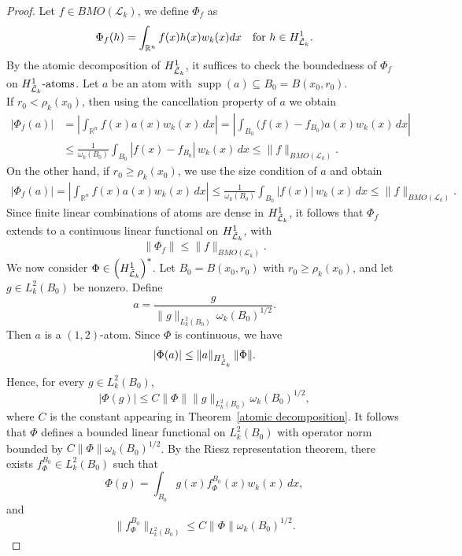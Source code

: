 \documentclass[10pt,a4paper]{amsart}
\begin{document}
\begin{proof}
Let $f \in BMO(\mathcal{L}_k)$, we define $\Phi_f$ as 
\begin{align*}
    \Phi_f(h) = \int_{\mathbb{R}^n} f(x)h(x)w_k(x)dx \quad \text{for } h\in H_{\Tilde{\mathcal{L}}_k}^1.
\end{align*}
By the atomic decomposition of $H_{\Tilde{\mathcal{L}}_k}^1$, it suffices to check the boundedness of  $\Phi_f$ on $H_{\Tilde{\mathcal{L}}_k}^{1} \text{-atoms}$. Let $a$ be an atom with $\operatorname{supp}(a)\subseteq B_0=B(x_0,r_0)$. \\

\noindent  If $r_0 < \rho_k(x_0)$, then using the cancellation property of $a$ we obtain
\begin{align*}
|\Phi_f(a)|
&= \left| \int_{\mathbb{R}^n} f(x)a(x)w_k(x)\,dx \right|
 = \left| \int_{B_0}\big(f(x)-f_{B_0}\big)a(x)w_k(x)\,dx \right| \\
&\le \frac{1}{\omega_k(B_0)} \int_{B_0} |f(x)-f_{B_0}|\, w_k(x)\,dx
\le \|f\|_{BMO(\mathcal{L}_k)} .
\end{align*}
On the other hand, if $r_0 \geq \rho_k(x_0)$, we use the size condition of $a$ and obtain
\begin{align*}
|\Phi_f(a)|
= \left| \int_{\mathbb{R}^n} f(x)a(x)w_k(x)\,dx \right|
\le \frac{1}{\omega_k(B_0)} \int_{B_0} |f(x)|\, w_k(x)\,dx
\le \|f\|_{BMO(\mathcal{L}_k)} .
\end{align*}
Since finite linear combinations of atoms are dense in $H_{\Tilde{\mathcal{L}}_k}^1$, it follows that $\Phi_f$ extends to a continuous linear functional on $H_{\Tilde{\mathcal{L}}_k}^1$, with
\[
\|\Phi_f\| \leq \|f\|_{BMO(\mathcal{L}_k)}.
\]
We now consider $\Phi \in \left(H_{\Tilde{\mathcal{L}}_k}^1\right)^*$. Let $B_0 = B(x_0,r_0)$ with $r_0 \ge \rho_k(x_0)$, and let $g \in L_k^2(B_0)$ be nonzero. Define
\[
a = \frac{g}{\|g\|_{L_k^2(B_0)}\, \omega_k(B_0)^{1/2}} .
\]
Then $a$ is a $(1,2)$-atom. Since $\Phi$ is continuous, we have
\[
|\Phi(a)| \le \|a\|_{H_{\Tilde{\mathcal{L}}_k}^1}\,\|\Phi\|.
\]
Hence, for every $g \in L_k^2(B_0)$,
\[
|\Phi(g)| \le C \|\Phi\| \|g\|_{L_k^2(B_0)} \omega_k(B_0)^{1/2},
\]
where $C$ is the constant appearing in Theorem~\ref{atomic decomposition}. It follows that $\Phi$ defines a bounded linear functional on $L_k^2(B_0)$ with operator norm bounded by $C\|\Phi\|\omega_k(B_0)^{1/2}$. By the Riesz representation theorem, there exists $f_\Phi^{B_0} \in L_k^2(B_0)$ such that
\[
\Phi(g) = \int_{B_0} g(x) f_\Phi^{B_0}(x) w_k(x)\,dx,
\]
and
\[
\|f_\Phi^{B_0}\|_{L_k^2(B_0)} \le C \|\Phi\| \omega_k(B_0)^{1/2}.
\]
\end{proof}
\end{document}
